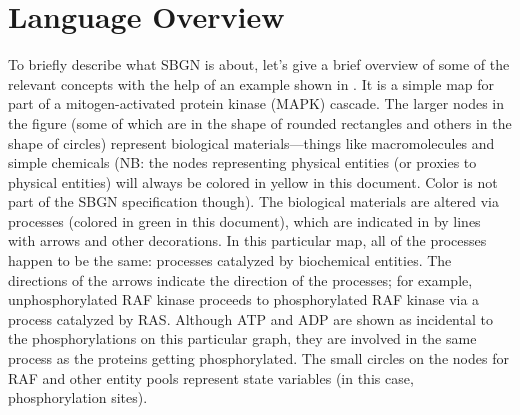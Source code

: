 \chapter{Language Overview}
\label{chp:concepts}

\label{sec:PD-overview}

 To briefly describe what SBGN \PDl is about, let's give a brief overview of some of the relevant concepts with the help of an example shown in . It is a simple map for part of a mitogen-activated protein kinase (MAPK) cascade.  The larger nodes in the figure (some of which are in the shape of rounded rectangles and others in the shape of circles) represent biological materials---things like macromolecules and simple chemicals (NB: the nodes representing physical entities (or proxies to physical entities) will always be colored in yellow in this document. Color is not part of the SBGN specification though).
 The biological materials are altered via processes (colored in green in this document), which are indicated in \PDl by lines with arrows and other decorations.  In this particular map, all of the processes happen to be the same: processes catalyzed by biochemical entities.
 The directions of the arrows indicate the direction of the processes; for example, unphosphorylated RAF kinase proceeds to phosphorylated RAF kinase via a process catalyzed by RAS. Although ATP and ADP are shown as incidental to the phosphorylations on this particular graph, they are involved in the same process as the proteins getting
 phosphorylated. The small circles on the nodes for RAF and other entity pools represent state variables (in this case, phosphorylation sites).

